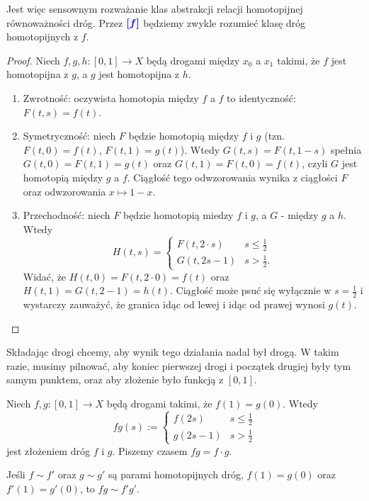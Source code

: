 Jest więc sensownym rozważanie klas abstrakcji relacji homotopijnej równoważności dróg. Przez $\color{blue}\boldsymbol{[f]}$ będziemy zwykle rozumieć klasę dróg homotopijnych z $f$.

\begin{proof}
  Niech $f, g, h:[0,1]\to X$ będą drogami między $x_0$ a $x_1$ takimi, że $f$ jest homotopijna z $g$, a $g$ jest homotopijna z $h$.

  \begin{enumerate}
    \item Zwrotność: oczywista homotopia między $f$ a $f$ to identyczność: $F(t, s)=f(t)$.
    \item Symetryczność: niech $F$ będzie homotopią między $f$ i $g$ (tzn. $F(t, 0)=f(t)$, $F(t, 1)=g(t)$). Wtedy $G(t, s)=F(t, 1-s)$ spełnia $G(t, 0)=F(t, 1)=g(t)$ oraz $G(t, 1)=F(t, 0)=f(t)$, czyli $G$ jest homotopią między $g$ a $f$. Ciągłość tego odwzorowania wynika z ciągłości $F$ oraz odwzorowania $x\mapsto 1-x$.
    \item Przechodność: niech $F$ będzie homotopią miedzy $f$ i $g$, a $G$ - między $g$ a $h$. Wtedy 
      $$H(t, s)=
      \begin{cases}
        F(t, 2\cdot s) & s\leq \frac{1}{2}\\ 
        G(t, 2s-1) & s>\frac{1}{2}.
      \end{cases}$$
      Widać, że $H(t, 0)=F(t, 2\cdot 0)=f(t)$ oraz $H(t, 1)=G(t, 2-1)=h(t)$. Ciągłość może psuć się wyłącznie w $s=\frac{1}{2}$ i wystarczy zauważyć, że granica idąc od lewej i idąc od prawej wynosi $g(t)$.
  \end{enumerate}
\end{proof}

Składając drogi chcemy, aby wynik tego działania nadal był drogą. W takim razie, musimy pilnować, aby koniec pierwszej drogi i początek drugiej były tym samym punktem, oraz aby złożenie było funkcją z $[0,1]$.

\begin{definition}
  Niech $f,g:[0,1]\to X$ będą drogami takimi, że $f(1)=g(0)$. Wtedy 
  $$fg(s):=\begin{cases}f(2s)&s\leq\frac{1}{2}\\ g(2s-1) & s>\frac{1}{2}\end{cases}$$
  jest złożeniem dróg $f$ i $g$. Piszemy czasem $fg=f\cdot g$.
\end{definition}

\begin{fact}\label{fakt:1.2}
  Jeśli $f\sim f'$ oraz $g\sim g'$ są parami homotopijnych dróg, $f(1)=g(0)$ oraz $f'(1)=g'(0)$, to $fg\sim f'g'$.
\end{fact}

